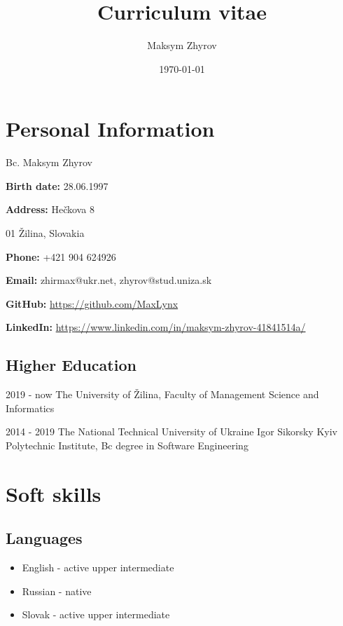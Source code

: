 \documentclass[a4paper,12pt]{article}
\author{Maksym Zhyrov}
\title{Curriculum vitae}
\date{\today}
\begin{document}
\section*{Personal Information}


{\Large Bc. Maksym Zhyrov}

\bigskip

\textbf{Birth date:} 28.06.1997

\smallskip

\textbf{Address:} 
Hečkova 8

\smallskip
\quad \quad \quad \quad {} 01 Žilina, 
Slovakia

\smallskip

\textbf{Phone:} +421 904 624926

\smallskip

\textbf{Email:} 
zhirmax@ukr.net, 
zhyrov@stud.uniza.sk 

\smallskip

\textbf{GitHub:} \url{https://github.com/MaxLynx}

\smallskip

\textbf{LinkedIn:} \url{https://www.linkedin.com/in/maksym-zhyrov-41841514a/}

\subsection*{Higher Education}

2019 - now The University of Žilina,
Faculty of Management Science and Informatics

2014 - 2019 The National Technical University of Ukraine 
Igor Sikorsky Kyiv Polytechnic Institute,
Bc degree in Software Engineering

\section*{Soft skills}

\subsection*{Languages}

\begin{itemize}
    \item English - active upper intermediate
    \item Russian - native
    \item Slovak - active upper intermediate
\end{itemize}
\end{document}
